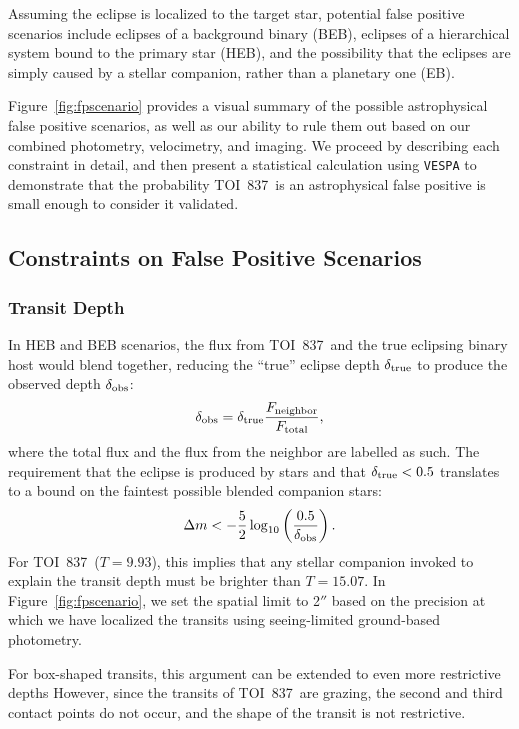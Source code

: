 \documentclass[12pt,twocolumn,tighten]{aastex63}
\newcommand{\tn}{TOI~837} %
\begin{document}
Assuming the eclipse is localized to the target star, potential false positive scenarios
include eclipses of a background binary (BEB), eclipses of a
hierarchical system bound to the primary star (HEB), and the possibility
that the eclipses are simply caused by a stellar companion,
rather than a planetary one (EB).

Figure~\ref{fig:fpscenario} provides a visual summary of the possible
astrophysical false positive scenarios, as well as our ability to rule
them out based on our combined photometry, velocimetry, and imaging.
We proceed by describing each constraint in detail, and then present a
statistical calculation using \texttt{VESPA}
\citep{morton_efficient_2012} to demonstrate that the probability \tn\
is an astrophysical false positive is small enough to consider it
validated.



\subsection{Constraints on False Positive Scenarios}
\label{subsec:fp_constraints}

\subsubsection{Transit Depth}
In HEB and BEB scenarios, the flux from \tn\ and the true eclipsing
binary host would blend together, reducing the ``true'' eclipse depth
$\delta_{\rm true}$ to produce the observed depth
$\delta_{\rm obs}$:
\begin{equation}
  \delta_{\rm obs}
  = 
  \delta_{\rm true} \frac{F_{\rm neighbor}}{F_{\rm total}},
\end{equation}
where the total flux and the flux from the neighbor are labelled as
such.  The requirement that the eclipse is produced by stars and that
$\delta_{\rm true} < 0.5$ translates to a bound on the faintest
possible blended companion stars:
\begin{equation}
  \Delta m < -\frac{5}{2} \log_{10} \left( \frac{0.5}{\delta_{\rm obs}} \right).
\end{equation}
For \tn\ ($T=9.93$), this implies that any stellar companion invoked
to explain the transit depth must be brighter than $T=15.07$.  In
Figure~\ref{fig:fpscenario}, we set the spatial limit to 2$''$ based
on the precision at which we have localized the transits using
seeing-limited ground-based photometry.

For box-shaped transits, this argument can be
extended to even more restrictive depths \citep[{\it
e.g.},][]{seager_unique_2003,vanderburg_hr858_2019,rizzuto_tess_2020}
However, since the transits of \tn\ are grazing, the second and third
contact points do not occur, and the shape of the transit is not
restrictive.
\end{document}
